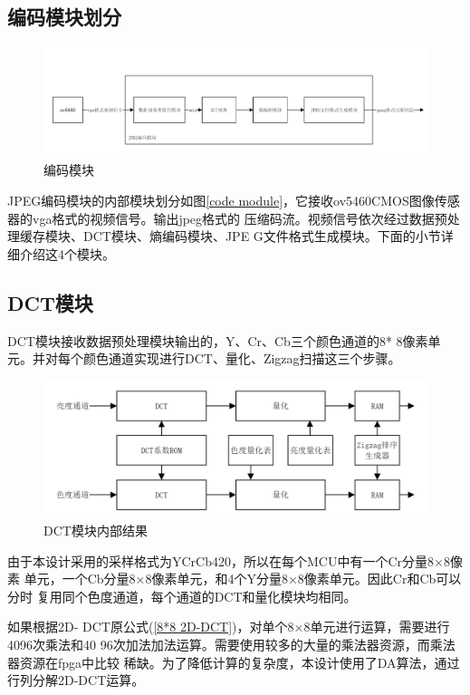 \documentclass{article}
\numberwithin {equation}{section}
\begin{document}
\begin{spacing}{1.25}
  \subsection{编码模块划分}
    \vspace{1em}
    \begin{figure}[H]
      \centering
      \includegraphics[scale=0.3]{./pictures/编码模块.png}
      \caption{编码模块}
      \label{code module}
    \end{figure}
    JPEG编码模块的内部模块划分如图\ref{code 
    module}，它接收ov5460CMOS图像传感器的vga格式的视频信号。输出jpeg格式的
    压缩码流。视频信号依次经过数据预处理缓存模块、DCT模块、熵编码模块、JPE
    G文件格式生成模块。下面的小节详细介绍这4个模块。
  \subsection{DCT模块}
    \vspace{1em}
    DCT模块接收数据预处理模块输出的，Y、Cr、Cb三个颜色通道的8*
    8像素单元。并对每个颜色通道实现进行DCT、量化、Zigzag扫描这三个步骤。
    \begin{figure}[H]
      \centering
      \includegraphics[scale=0.5]{./pictures/dct.png}
      \caption{DCT模块内部结果}
      \label{code module}
    \end{figure}

    由于本设计采用的采样格式为YCrCb420，所以在每个MCU中有一个Cr分量8×8像素
    单元，一个Cb分量8×8像素单元，和4个Y分量8×8像素单元。因此Cr和Cb可以分时
    复用同个色度通道，每个通道的DCT和量化模块均相同。

    如果根据2D-
    DCT原公式(\ref{8*8 2D-DCT})，对单个8×8单元进行运算，需要进行4096次乘法和40
    96次加法加法运算。需要使用较多的大量的乘法器资源，而乘法器资源在fpga中比较
    稀缺。为了降低计算的复杂度，本设计使用了DA算法，通过行列分解2D-DCT运算。

\end{spacing}
\end{document}
